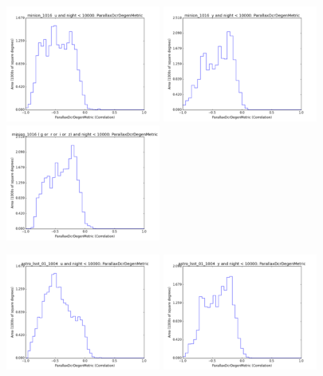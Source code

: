 \begin{figure}[ht]
  \begin{center}
  \includegraphics[width=2.0in]{./figs/milkyway/astromPanels/MW_Astrom_paDcrDegen_Baseline_u_hst.png}
  \includegraphics[width=2.0in]{./figs/milkyway/astromPanels/MW_Astrom_paDcrDegen_Baseline_y_hst.png}
  \includegraphics[width=2.0in]{./figs/milkyway/astromPanels/MW_Astrom_paDcrDegen_Baseline_10y_hst.png}
  \end{center}
  \begin{center}
  \includegraphics[width=2.0in]{./figs/milkyway/astromPanels/MW_Astrom_paDcrDegen_wfdPlane_u_hst.png}
  \includegraphics[width=2.0in]{./figs/milkyway/astromPanels/MW_Astrom_paDcrDegen_wfdPlane_y_hst.png}

\end{center}
\end{figure}
